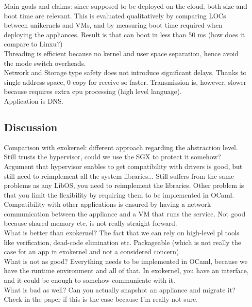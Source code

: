Main goals and claims: since supposed to be deployed on the cloud, both size and boot time are relevant.
This is evaluated qualitatively by comparing LOCs between unikernels and VMs, and by measuring boot time required when deploying the appliances.
Result is that can boot in less than 50 ms (how does it compare to Linxu?)\\

Threading is efficient because no kernel and user space separation, hence avoid the mode switch overheads.\\

Network and Storage type safety does not introduce significant delays.
Thanks to single address space, 0-copy for receive so faster.
Transmission is, however, slower because requires extra cpu processing (high level language).\\

Application is DNS.

\subsection{Discussion}

Comparison with exokernel: different approach regarding the abstraction level.
Still trusts the hypervisor, could we use the SGX to protect it somehow?
Argument that hypervisor enables to get compatibility with drivers is good, but still need to reimplement all the system libraries...
Still suffers from the same problems as any LibOS, you need to reimplement the libraries.
Other problem is that you limit the flexibility by requiring them to be implemented in OCaml.
Compatibility with other applications is ensured by having a network communication between the appliance and a VM that runs the service.
Not good because shared memory etc. is not really straight forward.\\

What is better than exokernel? 
The fact that we can rely on high-level pl tools like verification, dead-code elimination etc.
Packageable (which is not really the case for an app in exokernel and not a considered concern).\\

What is not as good?
Everything needs to be implemented in OCaml, because we have the runtime environment and all of that.
In exokernel, you have an interface, and it could be enough to somehow communicate with it.\\

What is bad as well?
Can you actually snapshot an appliance and migrate it?
Check in the paper if this is the case because I'm really not sure.
